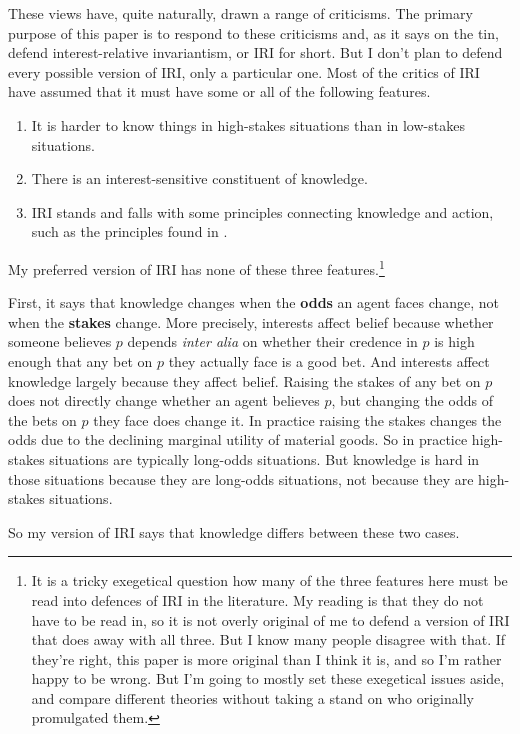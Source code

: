 These views have, quite naturally, drawn a range of criticisms. The primary purpose of this paper is to respond to these criticisms and, as it says on the tin, defend interest-relative invariantism, or IRI for short. But I don't plan to defend every possible version of IRI, only a particular one. Most of the critics of IRI have assumed that it must have some or all of the following features.

\begin{enumerate}
\item It is harder to know things in high-stakes situations than in low-stakes situations.
\item There is an interest-sensitive constituent of knowledge.
\item IRI stands and falls with some principles connecting knowledge and action, such as the principles found in \citet{Hawthorne2008-HAWKAA}.
\end{enumerate}

\noindent My preferred version of IRI has none of these three features.\footnote{It is a tricky exegetical question how many of the three features here must be read into defences of IRI in the literature. My reading is that they do not have to be read in, so it is not overly original of me to defend a version of IRI that does away with all three. But I know many people disagree with that. If they're right, this paper is more original than I think it is, and so I'm rather happy to be wrong. But I'm going to mostly set these exegetical issues aside, and compare different theories without taking a stand on who originally promulgated them.}

First, it says that knowledge changes when the \textbf{odds} an agent faces change, not when the \textbf{stakes} change. More precisely, interests affect belief because  whether someone believes $p$ depends \textit{inter alia} on whether their credence in $p$ is high enough that any bet on $p$ they actually face is a good bet. And interests affect knowledge largely because they affect belief. Raising the stakes of any bet on $p$ does not directly change whether an agent believes $p$, but changing the odds of the bets on $p$ they face does change it. In practice raising the stakes changes the odds due to the declining marginal utility of material goods. So in practice high-stakes situations are typically long-odds situations. But knowledge is hard in those situations because they are long-odds situations, not because they are high-stakes situations.

So my version of IRI says that knowledge differs between these two cases.

